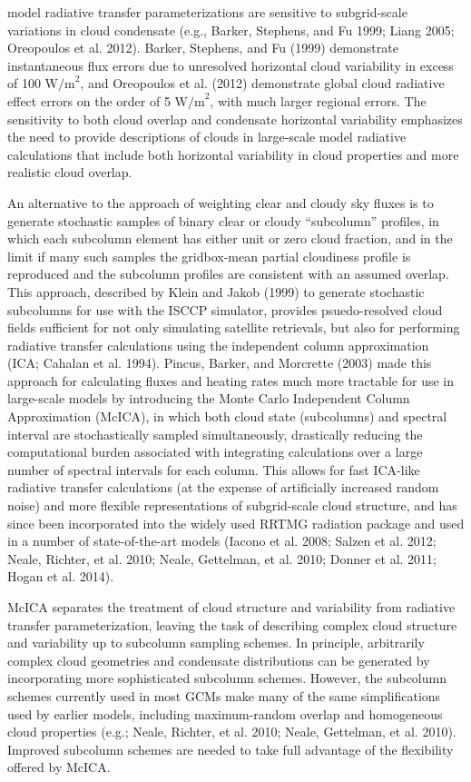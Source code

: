 model radiative transfer parameterizations are sensitive to
subgrid-scale variations in cloud condensate (e.g., Barker, Stephens,
and Fu 1999; Liang 2005; Oreopoulos et al. 2012). Barker, Stephens, and
Fu (1999) demonstrate instantaneous flux errors due to unresolved
horizontal cloud variability in excess of 100 \(\textrm{W/m}^2\), and
Oreopoulos et al. (2012) demonstrate global cloud radiative effect
errors on the order of 5 \(\textrm{W/m}^2\), with much larger regional
errors. The sensitivity to both cloud overlap and condensate horizontal
variability emphasizes the need to provide descriptions of clouds in
large-scale model radiative calculations that include both horizontal
variability in cloud properties and more realistic cloud overlap.

An alternative to the approach of weighting clear and cloudy sky fluxes
is to generate stochastic samples of binary clear or cloudy
``subcolumn'' profiles, in which each subcolumn element has either unit
or zero cloud fraction, and in the limit if many such samples the
gridbox-mean partial cloudiness profile is reproduced and the subcolumn
profiles are consistent with an assumed overlap. This approach,
described by Klein and Jakob (1999) to generate stochastic subcolumns
for use with the ISCCP simulator, provides psuedo-resolved cloud fields
sufficient for not only simulating satellite retrievals, but also for
performing radiative transfer calculations using the independent column
approximation (ICA; Cahalan et al. 1994). Pincus, Barker, and Morcrette
(2003) made this approach for calculating fluxes and heating rates much
more tractable for use in large-scale models by introducing the Monte
Carlo Independent Column Approximation (McICA), in which both cloud
state (subcolumns) and spectral interval are stochastically sampled
simultaneously, drastically reducing the computational burden associated
with integrating calculations over a large number of spectral intervals
for each column. This allows for fast ICA-like radiative transfer
calculations (at the expense of artificially increased random noise) and
more flexible representations of subgrid-scale cloud structure, and has
since been incorporated into the widely used RRTMG radiation package and
used in a number of state-of-the-art models (Iacono et al. 2008; Salzen
et al. 2012; Neale, Richter, et al. 2010; Neale, Gettelman, et al. 2010;
Donner et al. 2011; Hogan et al. 2014).

McICA separates the treatment of cloud structure and variability from
radiative transfer parameterization, leaving the task of describing
complex cloud structure and variability up to subcolumn sampling
schemes. In principle, arbitrarily complex cloud geometries and
condensate distributions can be generated by incorporating more
sophisticated subcolumn schemes. However, the subcolumn schemes
currently used in most GCMs make many of the same simplifications used
by earlier models, including maximum-random overlap and homogeneous
cloud properties (e.g.; Neale, Richter, et al. 2010; Neale, Gettelman,
et al. 2010). Improved subcolumn schemes are needed to take full
advantage of the flexibility offered by McICA.

